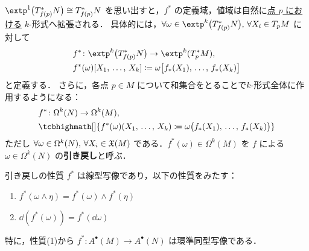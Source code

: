 \documentclass[geometry_main]{subfiles}
\begin{document}
$\extp^1 \bigl( T^*_{f(p)} N\bigr) \cong T^*_{f(p)} N$ を思い出すと，$f^*$ の定義域，値域は自然に\underline{点 $p$ における} $k$-形式へ拡張される．
具体的には，$\forall \omega \in \extp^k\bigl(T_{f(p)}^* N\bigr),\, \forall X_i \in T_p M$ に対して
\begin{align} 
	&f^* \colon \extp^k\bigl(T_{f(p)}^* N\bigr) \to \extp^k(T_{p}^*M), \\
	&f^*(\omega)[X_1,\, \dots ,\, X_k] \coloneqq \omega\bigl[f_*(X_1),\, \dots ,\, f_*(X_k)\bigr]
\end{align}
と定義する．
さらに，各点 $p \in M$ について和集合をとることで$k$-形式全体に作用するようになる：
\begin{align} 
	&f^* \colon \Omega^k(N) \to \Omega^k(M), \\
	&\tcbhighmath[]{f^*(\omega)(X_1,\, \dots ,\, X_k) \coloneqq \omega\bigl(f_*(X_1),\, \dots ,\, f_*(X_k)\bigr)} \label{def.k-form_pullback}
\end{align}
ただし $\forall \omega \in \Omega^k(N),\, \forall X_i \in \mathfrak{X}(M)$ である．$f^*(\omega) \in \Omega^k(M)$ を $f$ による $\omega \in \Omega^k(N)$ の\textbf{引き戻し}と呼ぶ．

\begin{myprop}[label=prop.pullback]{引き戻しの性質} 
	$f^*$ は線型写像であり，以下の性質をみたす：
	\begin{enumerate} 
		\item $f^*(\omega \wedge \eta) = f^*(\omega) \wedge f^*(\eta)$
		\item $\dd{(f^*(\omega))} = f^*(\dd{\omega})$
	\end{enumerate}
	特に，性質(1)から $f^* \colon A^\bullet(M) \to A^\bullet(N)$ は環準同型写像である．
\end{myprop}
\end{document}
